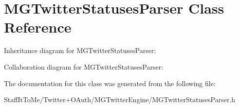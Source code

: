\hypertarget{interface_m_g_twitter_statuses_parser}{
\section{\-M\-G\-Twitter\-Statuses\-Parser \-Class \-Reference}
\label{interface_m_g_twitter_statuses_parser}
}


\-Inheritance diagram for \-M\-G\-Twitter\-Statuses\-Parser\-:


\-Collaboration diagram for \-M\-G\-Twitter\-Statuses\-Parser\-:


\-The documentation for this class was generated from the following file\-:\begin{DoxyCompactItemize}
\item 
\-Staff\-It\-To\-Me/\-Twitter+\-O\-Auth/\-M\-G\-Twitter\-Engine/\-M\-G\-Twitter\-Statuses\-Parser.\-h\end{DoxyCompactItemize}
